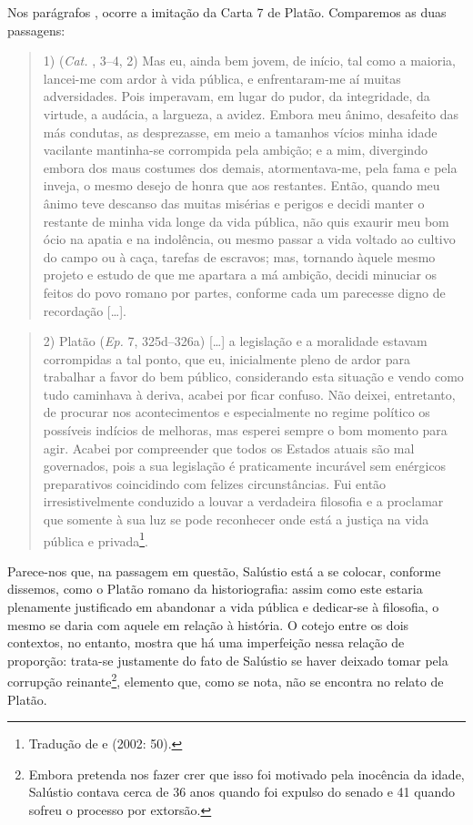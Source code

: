 Nos parágrafos , ocorre a imitação da Carta 7 de Platão. Comparemos as duas
passagens: \begin{quote}

1)	(\emph{Cat.} , 3--4, 2) Mas eu, ainda bem jovem, de início, tal como a
maioria, lancei-me com ardor à vida pública, e enfrentaram-me aí muitas
adversidades. Pois imperavam, em lugar do pudor, da integridade, da virtude, a
audácia, a largueza, a avidez.  Embora meu ânimo, desafeito das más condutas,
as desprezasse, em meio a tamanhos vícios minha idade vacilante mantinha-se
corrompida pela ambição; e a mim, divergindo embora dos maus costumes dos
demais, atormentava-me, pela fama e pela inveja, o mesmo desejo de honra que
aos restantes. Então, quando meu ânimo teve descanso das muitas misérias e
perigos e decidi manter o restante de minha vida longe da vida pública, não
quis exaurir meu bom ócio na apatia e na indolência, ou mesmo passar a vida
voltado ao cultivo do campo ou à caça, tarefas de escravos; mas, tornando
àquele mesmo projeto e estudo de que me apartara a má ambição, decidi minuciar
os feitos do povo romano por partes, conforme cada um parecesse digno de
recordação [\ldots{}].  \end{quote}

\begin{quote} 2) Platão (\emph{Ep.} 7, 325d--326a) [\ldots{}] a legislação e a moralidade
  estavam corrompidas a tal ponto, que eu, inicialmente pleno de ardor para
  trabalhar a favor do bem público, considerando esta situação e vendo como
  tudo caminhava à deriva, acabei por ficar confuso. Não deixei, entretanto, de
  procurar nos acontecimentos e especialmente no regime político os possíveis
  indícios de melhoras, mas esperei sempre o bom momento para agir. Acabei por
  compreender que todos os Estados atuais são mal governados, pois a sua
  legislação é praticamente incurável sem enérgicos preparativos coincidindo
  com felizes circunstâncias. Fui então irresistivelmente conduzido a louvar a
  verdadeira filosofia e a proclamar que somente à sua luz se pode reconhecer
  onde está a justiça na vida pública e privada\footnote{Tradução de 
  e  (2002: 50).}.  \end{quote}

Parece-nos que, na passagem em questão, Salústio está a se colocar, conforme
dissemos, como o Platão romano da historiografia: assim como este estaria
plenamente justificado em abandonar a vida pública e dedicar-se à filosofia, o
mesmo se daria com aquele em relação à história. O cotejo entre os dois
contextos, no entanto, mostra que há uma imperfeição nessa relação de
proporção: trata-se justamente do fato de Salústio se haver deixado tomar pela
corrupção reinante\footnote{Embora pretenda nos fazer crer que isso foi motivado
pela inocência da idade, Salústio contava cerca de 36 anos quando foi
expulso do senado e 41 quando sofreu o processo por extorsão.}, elemento que,
como se nota, não se encontra no relato de Platão.



